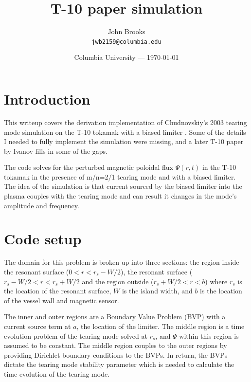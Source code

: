 \documentclass{article}
\title{T-10 paper simulation} %
\author{John Brooks\\ \texttt{jwb2159@columbia.edu}} %
\date{Columbia University --- \today} %
\begin{document}
\maketitle %


\section{Introduction} %

This writeup covers the derivation implementation of Chudnovskiy's 2003 tearing mode simulation on the T-10 tokamak with a biased limiter \cite{2003}.  Some of the details I needed to fully implement the simulation were missing, and a later T-10 paper by Ivanov \cite{2014} fills in some of the gaps.  

The code solves for the perturbed magnetic poloidal flux $\Psi(r,t)$ in the T-10 tokamak in the presence of m/n=2/1 tearing mode and with a biased limiter.  The idea of the simulation is that current sourced by the biased limiter into the plasma couples with the tearing mode and can result it changes in the mode's amplitude and frequency\cite{2003}.    




\section{Code setup} %

The domain for this problem is broken up into three sections: the region inside the resonant surface ($0<r<r_s-W/2$), the resonant surface ($r_s-W/2<r<r_s+W/2$ and the region outside ($r_s+W/2<r<b$) where $r_s$ is the location of the resonant surface, $W$ is the island width, and $b$ is the location of the vessel wall and magnetic sensor.  

The inner and outer regions are a Boundary Value Problem (BVP) with a current source term at $a$, the location of the limiter.  The middle region is a time evolution problem of the tearing mode solved at $r_s$, and $\Psi$ within this region is assumed to be constant.  The middle region couples to the outer regions by providing Dirichlet boundary conditions to the BVPs.  In return, the BVPs dictate the tearing mode stability parameter which is needed to calculate the time evolution of the tearing mode.   
\end{document}
